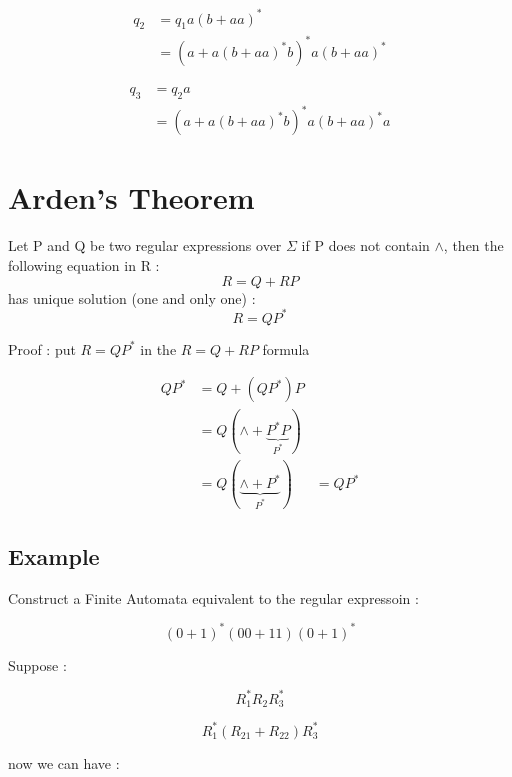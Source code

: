 \documentclass[12pt]{book}
\begin{document}
\begin{align*}
q_{2} &=  q_{1}a(b + aa)^{*} \\
&= (a + a(b + aa)^{*}b)^{*}a(b + aa)^{*}
\end{align*}


\begin{align*}
q_{3} &=  q_{2}a \\
&= (a + a(b + aa)^{*}b)^{*}a(b + aa)^{*}a
\end{align*}



\section{Arden's Theorem}

Let P and Q be two regular expressions over $\Sigma$ if P does not contain $\wedge$, then the following equation in R :
$$
R = Q + R P
$$
has unique solution (one and only one) :
$$
R = Q P^{*}
$$

Proof :
put $R =  QP^{*}$ in the $R = Q + R P$ formula

\begin{align*}
QP^{*} &= Q + (QP^{*})P \\
&= Q (\wedge + \underbrace{P^{*}P}_{P^{*}} ) \\
&= Q( \underbrace{\wedge + P^{*}}_{P^{*}})
&= QP^{*}
\end{align*}


\subsection{Example}

Construct a Finite Automata equivalent to the regular expressoin :

$$
(0 + 1)^{*} (00 + 11) (0 + 1)^{*}
$$

Suppose :

$$
R_{1}^{*} R_{2} R_{3}^{*}
$$

$$
R_{1}^{*} (R_{21} + R_{22}) R_{3}^{*}
$$

now we can have :

\end{document}
